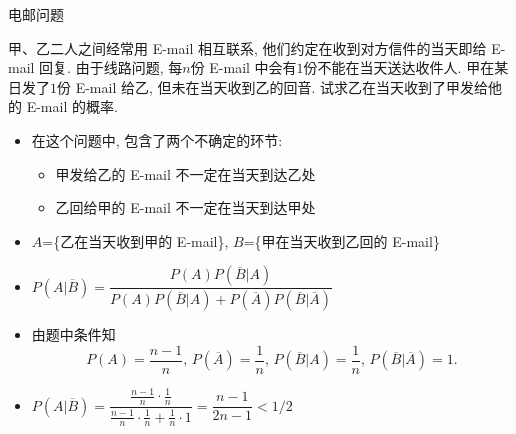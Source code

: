 \documentclass[Prob-All.tex]{subfiles}
\begin{document}
\begin{frame}{电邮问题}
	\vspace{-0.2cm}
	\begin{exam}
		甲、乙二人之间经常用 E-mail 相互联系, 他们约定在收到对方信件的当天即给 E-mail 回复. 由于线路问题, 每$n$份 E-mail 中会有$1$份不能在当天送达收件人. 甲在某日发了$1$份 E-mail 给乙, 但未在当天收到乙的回音. 试求乙在当天收到了甲发给他的 E-mail 的概率.
	\end{exam}
	\pause

	\begin{jieda}
		\begin{itemize}[<+-|alert@+>]
			\item 在这个问题中, 包含了两个不确定的环节:
			\begin{itemize}[<+-|alert@+>]
				\item 甲发给乙的 E-mail 不一定在当天到达乙处
				\item 乙回给甲的 E-mail 不一定在当天到达甲处
			\end{itemize}
			\item $A$=\{乙在当天收到甲的 E-mail\}, $B$=\{甲在当天收到乙回的 E-mail\}
			\item $P(A|\overline{B})=\dfrac{P(A)P(\overline{B}|A)}{P(A)P(\overline{B}|A)+P(\overline{A})P(\overline{B}|\overline{A})}$
			\item %
			由题中条件知
			$$P(A)=\frac{n-1}{n},\, P(\overline{A})=\frac{1}{n}, \,P(\overline{B}|A)=\frac{1}{n},\,P(\overline{B}|\overline{A})=1.$$
			\item $P(A|\overline{B})=\dfrac{\frac{n-1}{n}·\frac{1}{n}}{\frac{n-1}{n}·\frac{1}{n}+\frac{1}{n}·1}=\dfrac{n-1}{2n-1}<1/2$
		\end{itemize}
	\end{jieda}
\end{frame}
\end{document}
